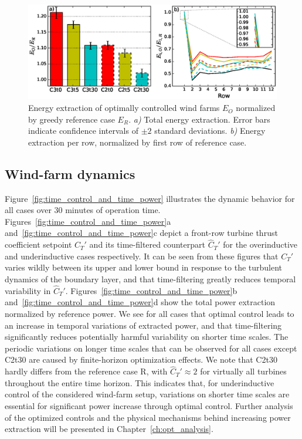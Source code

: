 \begin{figure}[t]
	\centering
	\includegraphics[width=\linewidth]{chapters/philtrans_torque/figure8.eps}
	\caption[Energy extraction of optimally controlled wind farms $E_O$ normalized by greedy reference case $E_R$.]{Energy extraction of optimally controlled wind farms $E_O$ normalized by greedy reference case $E_R$. \emph{a) } Total energy extraction. Error bars indicate confidence intervals of $\pm 2$ standard deviations. \emph{b) } Energy extraction per row, normalized by first row of reference case. \legend \label{fig:bar_and_row}}
\end{figure}

\subsection{Wind-farm dynamics}\label{sec:opt_ind_dyn}
Figure~\ref{fig:time_control_and_time_power} illustrates the dynamic behavior for all cases over 30 minutes of operation time. Figures~\ref{fig:time_control_and_time_power}a and~\ref{fig:time_control_and_time_power}c depict a front-row turbine thrust coefficient setpoint $C_T'$ and its time-filtered counterpart $\widehat{C}_T'$ for the overinductive and underinductive cases respectively. It can be seen from these figures that $C_T'$ varies wildly between its upper and lower bound in response to the turbulent dynamics of the boundary layer, and that time-filtering greatly reduces temporal variability in $\widehat{C}_T'$. Figures~\ref{fig:time_control_and_time_power}b and~\ref{fig:time_control_and_time_power}d show the total power extraction normalized by reference power. We see for all cases that optimal control leads to an increase in temporal variations of extracted power, and that time-filtering significantly reduces potentially harmful variability on shorter time scales. The periodic variations on longer time scales that can be observed for all cases except C2t30 are caused by finite-horizon optimization effects.
We note that C2t30 hardly differs from the reference case R, with $\widehat{C}_T' \approx 2$ for virtually all turbines throughout the entire time horizon. This indicates that, for underinductive control of the considered wind-farm setup, variations on shorter time scales are essential for significant power increase through optimal control. Further analysis of the optimized controls and the physical mechanisms behind increasing power extraction will be presented in Chapter~\ref{ch:opt_analysis}. 

